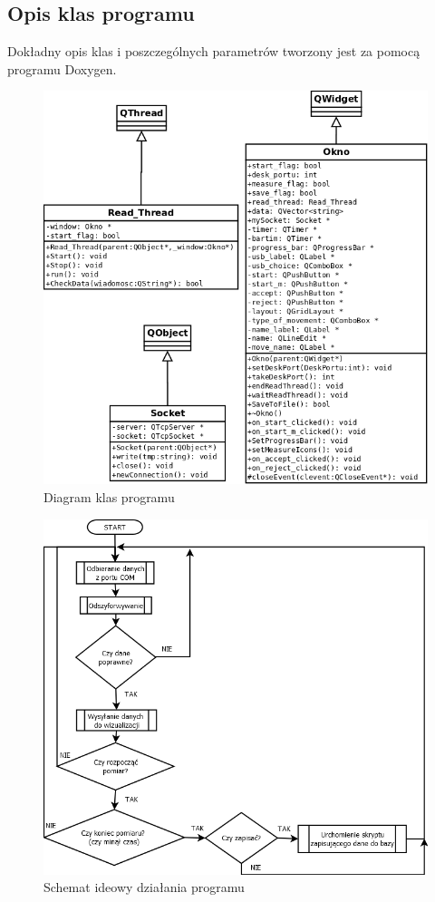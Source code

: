 \documentclass{article}
\begin{document}
\subsection{Opis klas programu}
Dokładny opis klas i poszczególnych parametrów tworzony jest za pomocą programu Doxygen.
\begin{figure}[H]
    \centering
    \includegraphics[scale=0.4]{autodia.png}
    \caption{Diagram klas programu}
    \label{rys:autodia}
\end{figure}

\begin{figure}[H]
    \centering
    \includegraphics[scale=0.6]{programdia.png}
    \caption{Schemat ideowy działania programu}
    \label{rys:programdia}
\end{figure}
\end{document}

